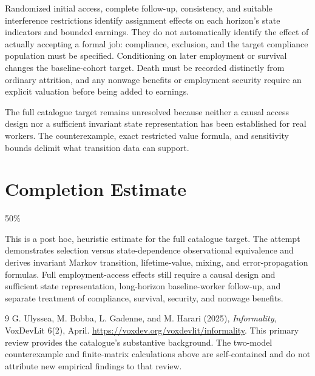 \documentclass[11pt,a4paper]{article}
\begin{document}
Randomized initial access, complete follow-up, consistency, and suitable
interference restrictions identify assignment effects on each horizon's
state indicators and bounded earnings. They do not automatically identify
the effect of actually accepting a formal job: compliance, exclusion, and
the target compliance population must be specified. Conditioning on later
employment or survival changes the baseline-cohort target. Death must be
recorded distinctly from ordinary attrition, and any nonwage benefits or
employment security require an explicit valuation before being added to
earnings.

The full catalogue target remains unresolved because neither a causal
access design nor a sufficient invariant state representation has been
established for real workers. The counterexample, exact restricted value
formula, and sensitivity bounds delimit what transition data can support.

\section{Completion Estimate}
50\%

This is a post hoc, heuristic estimate for the full catalogue target.
The attempt demonstrates selection versus state-dependence observational equivalence and derives invariant Markov transition, lifetime-value, mixing, and error-propagation formulas. Full employment-access effects still require a causal design and sufficient state representation, long-horizon baseline-worker follow-up, and separate treatment of compliance, survival, security, and nonwage benefits.

\begin{thebibliography}{9}
 G. Ulyssea, M. Bobba, L. Gadenne, and M. Harari (2025),
\emph{Informality}, VoxDevLit 6(2), April.
\url{https://voxdev.org/voxdevlit/informality}.
This primary review provides the catalogue's substantive background.
The two-model counterexample and finite-matrix calculations above are
self-contained and do not attribute new empirical findings to that review.
\end{thebibliography}
\end{document}
